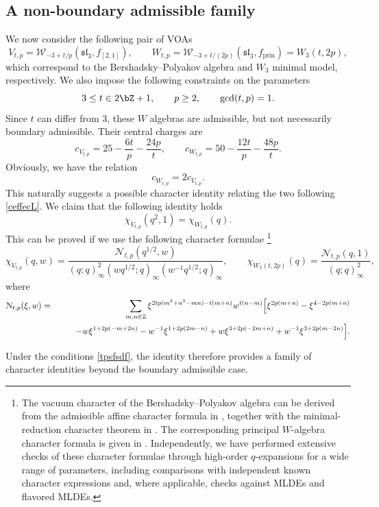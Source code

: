 \documentclass[a4paper,11pt]{article}
\theoremstyle{definition}
\theoremstyle{definition}
\theoremstyle{remark}
\newcommand{\be}{\begin{equation}}
\newcommand{\ee}{\end{equation}}
\newcommand{\beqn}{\begin{eqnarray}}
\newcommand{\eeqn}{\end{eqnarray}}
\begin{document}
\subsection{A non-boundary admissible family  }\label{nonadm22}
We now consider the following pair of VOAs 
\be 
V_{t,p}=\mathcal W_{-3+t/p}(\mathfrak{sl}_3,f_{[2,1]}), %
\qquad
W_{t, p}=\mathcal W_{-3+t/(2p)}(\mathfrak{sl}_3,f_{\mathrm{prin}})=W_3(t,2p),
\ee
which correspond to the Bershadsky--Polyakov algebra and $W_3$ minimal model, respectively. We also impose the following constraints on the parameters
\be \label{tpsfsdf}
3\le t\in 2\bZ+1 ,\qquad p\ge2,\qquad \gcd(t,p)=1.
\ee 
Since $t$ can differ from 3, these $W$ algebras are admissible, but not necessarily boundary admissible.
Their central charges   are 
\be
c_{V_{t, p}}=25 - \frac{6t }{p} -\frac{ 24p}{t},
\qquad
c_{W_{t, p}}=50 - \frac{12t }{p} -\frac{ 48p}{t}.
\ee
Obviously, we have the relation 
\be
c_{W_{t, p}}=2c_{V_{t, p}}.
\ee
This naturally suggests a possible character identity  relating the two following   \eqref{ceffecL}. 
We  claim that  the following identity  holds
 \be
 \chi_{V_{t,p}}(q^2,1)=\chi_{W_{t, p}}(q).
 \ee
 This can be proved   if we use the following character formulae  \footnote{The vacuum character of the Bershadsky--Polyakov algebra can be derived from the admissible affine character formula in \cite{KacWakimoto1989}, together with the minimal-reduction character theorem in \cite{ArakawaMinimalReduction}. The corresponding principal $W$-algebra character formula is
given in \cite{FrenkelKacWakimoto1992}. Independently, we have performed extensive checks of these character formulae
through high-order $q$-expansions for a wide range of parameters, including comparisons with independent known character expressions 
 and, where applicable, checks against MLDEs and flavored MLDEs.} 
  \be  
\chi_{V_{t,p}}(q,w)
 =\frac{\mathcal N_{t,p}(q^{1/2},w)}
 {(q;q)_\infty^2(wq^{1/2};q)_\infty
 (w^{-1}q^{1/2};q)_\infty}, 
\qquad
\chi_{W_3(t,2p)}(q)
=
\frac{\mathcal N_{t ,p}(q,1)}
{(q;q)_\infty^2},
\ee 
%
where
\beqn
\mathcal N_{t,p}(\xi,w)
&=&
\sum_{m,n\in\mathbb Z}
\xi^{2tp(m^2+n^2-mn)-t(m+n)}w^{t(n-m)}
  \Bigl[  \xi^{2p(m+n)}-\xi^{4-2p(m+n)}
\nonumber \\ &&\qquad
-w\xi^{1+2p(-m+2n)}
-w^{-1}\xi^{1+2p(2m-n)}
 +w\xi^{3+2p(-2m+n)}
+w^{-1}\xi^{3+2p(m-2n)}
  \Bigr].\nonumber \\
    \eeqn

 
  Under the conditions \eqref{tpsfsdf}, the identity therefore provides a family of character identities beyond the  boundary admissible case. 
\end{document}

